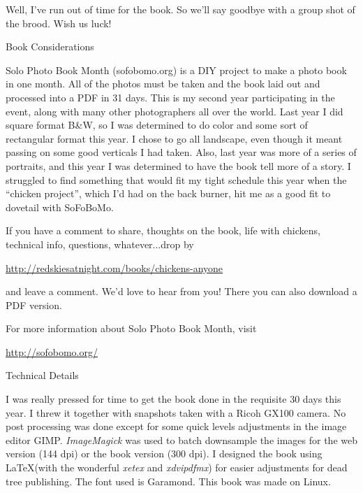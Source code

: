 Well, I've run out of time for the book. So we'll say goodbye with a
group shot of the brood. Wish us luck! 
\newpage

\vspace*{1in}

{\LARGE Book Considerations}

Solo Photo Book Month (sofobomo.org) is a DIY project to make a photo
book in one month. All of the photos must be taken and the book laid 
out and processed into a PDF in 31 days. This is my second year
participating in the event, along with many other photographers all over
the world. 
Last year I did square format B\&W, so I was determined to do color and
some sort of rectangular format this year. I chose to go all landscape, 
even though it meant passing on some good verticals I had taken. Also,
last year was more of a series of portraits, and this year I was
determined to have the book tell more of a story. I struggled to find
something that would fit my tight schedule this year when the ``chicken
project'', which I'd had on the back burner, hit me as a good fit to
dovetail with SoFoBoMo. 

If you have a comment to share, thoughts on the book, life with
chickens, technical info, questions, whatever...drop by 

\url{http://redskiesatnight.com/books/chickens-anyone}

and leave a comment. We'd love to hear from you! There you can also
download a PDF version. 

For more information about Solo Photo Book Month, visit

\url{http://sofobomo.org/}

\vspace*{0.25in}

{\LARGE Technical Details}

I was really pressed for time to get the book done in the requisite 30
days this year. I threw it together with snapshots taken with a Ricoh
GX100 camera. No post processing was done except for some quick levels
adjustments in the image editor GIMP.
{\em ImageMagick} was used to batch downsample the images for the web version
(144 dpi) or the book version (300 dpi). 
I designed the book using \LaTeX (with the wonderful {\em xetex} and
{\em xdvipdfmx}) for easier adjustments for dead tree publishing. 
The font used is Garamond. This book was made on Linux.

